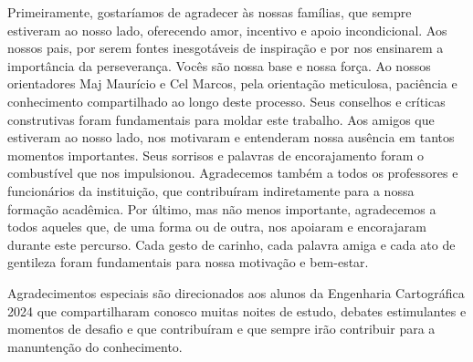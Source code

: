 
\begin{agradecimentos}
Primeiramente, gostaríamos de agradecer às nossas famílias, que sempre estiveram
ao nosso lado, oferecendo amor, incentivo e apoio incondicional. Aos nossos pais, por serem fontes inesgotáveis de inspiração e por nos ensinarem a importância da perseverança.
Vocês são nossa base e nossa força.
Ao nossos orientadores Maj Maurício e Cel Marcos, pela orientação meticulosa, paciência e conhecimento compartilhado ao longo deste processo. Seus conselhos e críticas construtivas foram fundamentais para moldar este trabalho.
Aos amigos que estiveram ao nosso lado, nos motivaram e entenderam nossa ausência
em tantos momentos importantes. Seus sorrisos e palavras de encorajamento foram o
combustível que nos impulsionou.
Agradecemos também a todos os professores e funcionários da instituição, que contribuíram indiretamente para a nossa formação acadêmica.
Por último, mas não menos importante, agradecemos a todos aqueles que, de uma forma
ou de outra, nos apoiaram e encorajaram durante este percurso. Cada gesto de carinho,
cada palavra amiga e cada ato de gentileza foram fundamentais para nossa motivação e
bem-estar.

Agradecimentos especiais são direcionados aos alunos da Engenharia Cartográfica 2024 que compartilharam conosco muitas noites de estudo, debates estimulantes e momentos de desafio e que contribuíram e que sempre irão contribuir para a manuntenção do conhecimento.

\end{agradecimentos}


